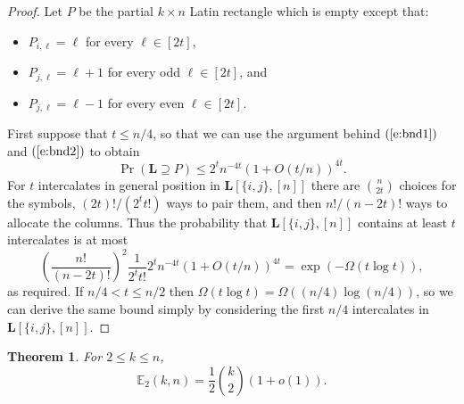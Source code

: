 \documentclass[12pt]{article}
\newtheorem{thm}{Theorem}[section]
\theoremstyle{definition}
\numberwithin{equation}{section}
\def\eref#1{$(\ref{#1})$}
\renewcommand{\leq}{\leqslant}
\renewcommand{\le}{\leqslant}
\renewcommand{\L}{\mathbf{L}}
\begin{document}
	\begin{proof} 
		Let $P$ be the partial $k \times n$ Latin rectangle which is empty except that:
		\begin{itemize}
		\item $P_{i, \ell} = \ell$ for every $\ell \in [2t]$,
		\item $P_{j, \ell} = \ell+1$ for every odd $\ell \in [2t]$, and
		\item $P_{j, \ell} = \ell-1$ for every even $\ell \in [2t]$.
		\end{itemize}
		First suppose that $t\le n/4$, so that we can use the argument behind
		\eref{e:bnd1} and \eref{e:bnd2} to obtain
		\[
		\Pr(\mathbf{L} \supseteq P) \leq 2^tn^{-4t}(1+O(t/n))^{4t}.
		\]
		For $t$ intercalates in general position in $\mathbf{L}[\{i, j\}, [n]]$
		there are $\binom{n}{2t}$ choices for the symbols, $(2t)!/(2^tt!)$ ways
		to pair them, and then $n!/(n-2t)!$ ways to allocate the columns.
		Thus the probability that $\L[\{i,j\},[n]]$ contains at least $t$
		intercalates is at most
		\[
		\left(\frac{n!}{(n-2t)!}\right)^2\frac1{2^tt!}2^tn^{-4t}(1+O(t/n))^{4t}
		= \exp(-\Omega(t\log t)),
		\]
		as required. If $n/4<t\le n/2$ then $\Omega(t\log t)=\Omega((n/4)\log(n/4))$,
		so we can derive the same bound simply
		by considering the first $n/4$ intercalates in $\mathbf{L}[\{i,j\},[n]]$.
	\end{proof}
	
	
	
\begin{thm}
  For $2 \leq k \leq n$, 
  \[
  \mathbb{E}_2(k,n)=\frac12\binom{k}{2}(1+o(1)).
  \]
\end{thm}
\end{document}
